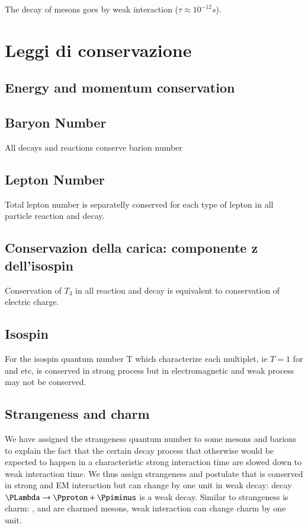 \documentclass[main.tex]{subfiles}
\begin{document}
The decay of \PD mesons goes by weak interaction ($\tau\approx10^{-12}s$).



\chapter{Leggi di conservazione}

\section{Energy and momentum conservation}

\section{Baryon Number}
All decays and reactions conserve barion number

\section{Lepton Number}
Total lepton number is separatelly conserved for each type of lepton in all particle reaction and decay.

\section{Conservazion della carica: componente z dell'isospin}
Conservation of $T_3$ in all reaction and decay is equivalent to conservation of electric charge.

\section{Isospin}

For the isospin quantum number T which characterize each multiplet, ie $T=1$ for \Pgr and \Ppi etc, is conserved in strong process but in electromagnetic and weak process may not be conserved. 

\section{Strangeness and charm}
We have assigned the strangeness quantum number to some mesons and barions to explain the fact that the certain decay process that otherwise would be expected to happen in a characteristic strong interaction time are slowed down to weak interaction time. We thus assign strangeness and postulate  that is conserved in strong and EM interaction but can change by one unit in weak decay: decay $\PLambda\rightarrow\Pproton+\Ppiminus$ is a weak decay. Similar to strangeness is charm: \PDpm, \PDz and \PaDz are charmed mesons, weak interaction can change charm by one unit.
 
\end{document}
